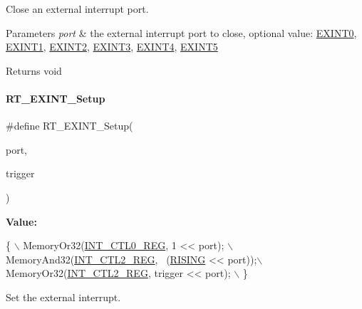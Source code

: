 Close an external interrupt port. 


\begin{DoxyParams}{Parameters}
{\em port} & the external interrupt port to close, optional value\+: \mbox{\hyperlink{a00011_a2e3f727d359d26314631842394f4a223}{E\+X\+I\+N\+T0}}, \mbox{\hyperlink{a00011_a1ea7d6796165b98f1bc6bf6fe841c3d9}{E\+X\+I\+N\+T1}}, \mbox{\hyperlink{a00011_ac959f4d8aed4e04e25c966e6c8315431}{E\+X\+I\+N\+T2}}, \mbox{\hyperlink{a00011_ae8428c0cbd7362b90ea048bcf59aef2c}{E\+X\+I\+N\+T3}}, \mbox{\hyperlink{a00011_a719b5fa27b5469e1fe2844e9930fa249}{E\+X\+I\+N\+T4}}, \mbox{\hyperlink{a00011_a309fb21107f9f6261cd7e7ca9de6c2f2}{E\+X\+I\+N\+T5}} \\
\hline
\end{DoxyParams}
\begin{DoxyReturn}{Returns}
void 
\end{DoxyReturn}
\mbox{\label{a00011_a32678a4a1877f8e6fcae9fad3dd436ed}} 
\paragraph{\texorpdfstring{R\+T\+\_\+\+E\+X\+I\+N\+T\+\_\+\+Setup}{RT\_EXINT\_Setup}}
{\footnotesize\ttfamily \#define R\+T\+\_\+\+E\+X\+I\+N\+T\+\_\+\+Setup(\begin{DoxyParamCaption}\item[{}]{port,  }\item[{}]{trigger }\end{DoxyParamCaption})}

{\bfseries Value\+:}
\begin{DoxyCode}
\{                                                \(\backslash\)
        MemoryOr32(\mbox{\hyperlink{a00020_a8de95a7e93d24e973c34d5a2acb174d6}{INT\_CTL0\_REG}}, 1 << port);         \(\backslash\)
        MemoryAnd32(\mbox{\hyperlink{a00020_a0f7890a929baefa8c8c2cf341d75844e}{INT\_CTL2\_REG}}, ~(\mbox{\hyperlink{a00011_aeea2b49478f3b13faedba764985c6e96}{RISING}} << port));\(\backslash\)
        MemoryOr32(\mbox{\hyperlink{a00020_a0f7890a929baefa8c8c2cf341d75844e}{INT\_CTL2\_REG}}, trigger << port);   \(\backslash\)
    \}
\end{DoxyCode}


Set the external interrupt. 


